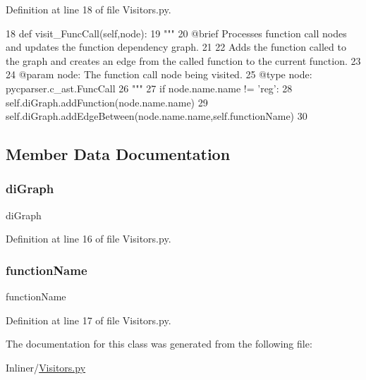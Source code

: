 Definition at line 18 of file Visitors.\+py.


\begin{DoxyCode}
18     \textcolor{keyword}{def }visit\_FuncCall(self,node):
19         \textcolor{stringliteral}{"""
}
20 \textcolor{stringliteral}{        @brief Processes function call nodes and updates the function dependency graph.
}
21 \textcolor{stringliteral}{
}
22 \textcolor{stringliteral}{        Adds the function called to the graph and creates an edge from the called function to the current
       function.
}
23 \textcolor{stringliteral}{
}
24 \textcolor{stringliteral}{        @param node: The function call node being visited.
}
25 \textcolor{stringliteral}{        @type node: pycparser.c\_ast.FuncCall
}
26 \textcolor{stringliteral}{        """}
27         \textcolor{keywordflow}{if} node.name.name != \textcolor{stringliteral}{'reg'}:
28             self.diGraph.addFunction(node.name.name)
29             self.diGraph.addEdgeBetween(node.name.name,self.functionName)
30 
\end{DoxyCode}


\subsection{Member Data Documentation}
\mbox{\label{classVisitors_1_1FunctionVisitor_a773d3c032f7708247230d5a2e169fe4d}} 
\subsubsection{\texorpdfstring{di\+Graph}{diGraph}}
{\footnotesize\ttfamily di\+Graph}



Definition at line 16 of file Visitors.\+py.

\mbox{\label{classVisitors_1_1FunctionVisitor_ab781b0aec3a9de0632eb6afda1e10288}} 
\subsubsection{\texorpdfstring{function\+Name}{functionName}}
{\footnotesize\ttfamily function\+Name}



Definition at line 17 of file Visitors.\+py.



The documentation for this class was generated from the following file\+:\begin{DoxyCompactItemize}
\item 
Inliner/\hyperlink{Visitors_8py}{Visitors.\+py}\end{DoxyCompactItemize}
